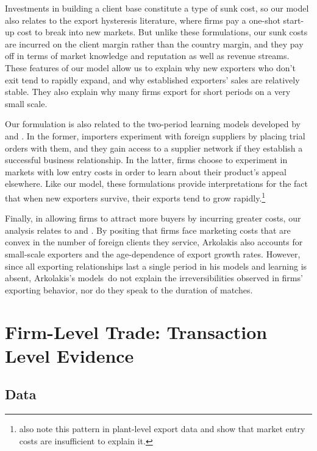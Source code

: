 Investments in building a client base constitute a type of sunk cost, so our
model also relates to the export hysteresis literature\citep{baldwin1989persistent, das2007market, dixit1989hysteresis, alessandria2007sunk, alessandria2010inventories}, where firms pay a one-shot start-up cost to break
into new markets. But unlike these formulations, our sunk costs are incurred
on the client margin rather than the country margin, and they pay off in
terms of market knowledge and reputation as well as revenue streams. These
features of our model allow us to explain why new exporters who don't exit
tend to rapidly expand, and why established exporters' sales are relatively
stable. They also explain why many firms export for short periods on a very
small scale.

Our formulation is also related to the two-period learning models developed
by \citet{rauch2003starting} and \citet{albornoz2012sequential}. In the former,
importers experiment with foreign suppliers by placing trial orders with
them, and they gain access to a supplier network if they establish a
successful business relationship. In the latter, firms choose to experiment
in markets with low entry costs in order to learn about their product's
appeal elsewhere. Like our model, these formulations provide interpretations
for the fact that when new exporters survive, their exports tend to grow
rapidly.\renewcommand{\baselinestretch}{1}\footnote{%
\citet{ruhl2008new} also note this pattern in plant-level export data and
show that market entry costs are insufficient to explain it.}

Finally, in allowing firms to attract more buyers by incurring greater
costs, our analysis relates to \citet{drozd2012understanding} and \citet{arkolakis2010market}\citep{arkolakis2011unified}. By positing that firms face marketing costs that are convex in the
number of foreign clients they service, Arkolakis also accounts for
small-scale exporters and the age-dependence of export growth rates.
However, since all exporting relationships last a single period in his
models and learning is absent, Arkolakis's models\ do not explain the
irreversibilities observed in firms' exporting behavior, nor do they speak
to the duration of matches.

\section{Firm-Level Trade: Transaction Level Evidence}
\label{sec:data}

\subsection{Data}

